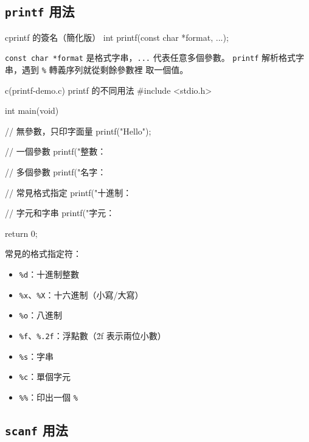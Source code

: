 \subsection{\texttt{printf} 用法}

\begin{code}{c}{printf 的簽名（簡化版）}
int printf(const char *format, ...);
\end{code}

\texttt{const char *format} 是格式字串，\texttt{...} 代表任意多個參數。
\texttt{printf} 解析格式字串，遇到 \texttt{\%} 轉義序列就從剩餘參數裡
取一個值。

\begin{example}{c}{(printf-demo.c) printf 的不同用法}
#include <stdio.h>

int main(void) {
    // 無參數，只印字面量
    printf("Hello\n");

    // 一個參數
    printf("整數：%

    // 多個參數
    printf("名字：%

    // 常見格式指定
    printf("十進制：%

    // 字元和字串
    printf("字元：%

    return 0;
}
\end{example}


常見的格式指定符：
\begin{itemize}
\item \texttt{\%d}：十進制整數
\item \texttt{\%x}、\texttt{\%X}：十六進制（小寫/大寫）
\item \texttt{\%o}：八進制
\item \texttt{\%f}、\texttt{\%.2f}：浮點數（\.2f 表示兩位小數）
\item \texttt{\%s}：字串
\item \texttt{\%c}：單個字元
\item \texttt{\%\%}：印出一個 \texttt{\%}
\end{itemize}

\subsection{\texttt{scanf} 用法}

